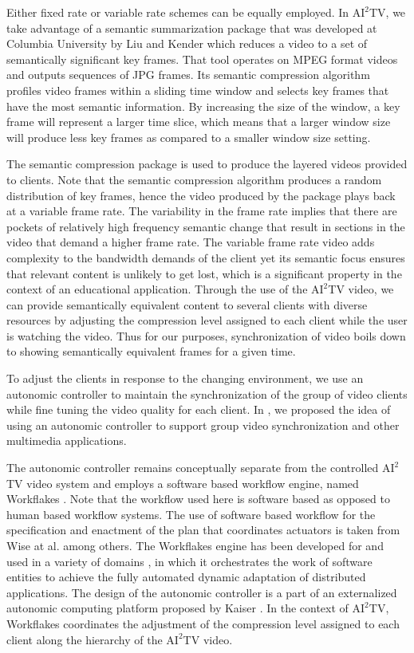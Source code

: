 \documentclass{sig-alternate}
\begin{document}
Either fixed rate or variable rate schemes can be equally employed. In
$\mathrm{AI}^2$TV, we take advantage of a semantic summarization
package that was developed at Columbia University by Liu and Kender
\cite{TIECHENG} which reduces a video to a set of semantically
significant key frames.  That tool operates on MPEG format videos and
outputs sequences of JPG frames.  Its semantic compression algorithm
profiles video frames within a sliding time window and selects key
frames that have the most semantic information.  By increasing the
size of the window, a key frame will represent a larger time slice,
which means that a larger window size will produce less key frames as
compared to a smaller window size setting.

The semantic compression package is used to produce the layered videos
provided to clients.  Note that the semantic compression algorithm
produces a random distribution of key frames, hence the video produced
by the package plays back at a variable frame rate.  The variability
in the frame rate implies that there are pockets of relatively high
frequency semantic change that result in sections in the video that
demand a higher frame rate.  The variable frame rate video adds
complexity to the bandwidth demands of the client yet its semantic
focus ensures that relevant content is unlikely to get lost, which is
a significant property in the context of an educational application.
Through the use of the $\mathrm{AI}^2$TV video, we can provide
semantically equivalent content to several clients with diverse
resources by adjusting the compression level assigned to each client
while the user is watching the video.  Thus for our purposes,
synchronization of video boils down to showing semantically equivalent
frames for a given time.

To adjust the clients in response to the changing environment, we use
an autonomic controller to maintain the synchronization of the group
of video clients while fine tuning the video quality for each client.
In \cite{RAVAGES}, we proposed the idea of using an autonomic
controller to support group video synchronization and other multimedia
applications.

The autonomic controller remains conceptually separate from the
controlled $\mathrm{AI}^2$TV video system and employs a software based
workflow engine, named Workflakes \cite{ICSE}.  Note that the workflow
used here is software based as opposed to human based workflow
systems.  The use of software based workflow for the specification and
enactment of the plan that coordinates actuators is taken from Wise at
al. \cite{OSTERWEIL} among others.  The Workflakes engine has been
developed for and used in a variety of domains \cite{AMS,ICSE}, in
which it orchestrates the work of software entities to achieve the
fully automated dynamic adaptation of distributed applications.  The
design of the autonomic controller is a part of an externalized
autonomic computing platform proposed by Kaiser \cite{REFARCH}.  In
the context of $\mathrm{AI}^2$TV, Workflakes coordinates the
adjustment of the compression level assigned to each client along the
hierarchy of the $\mathrm{AI}^2$TV video.
\end{document}
